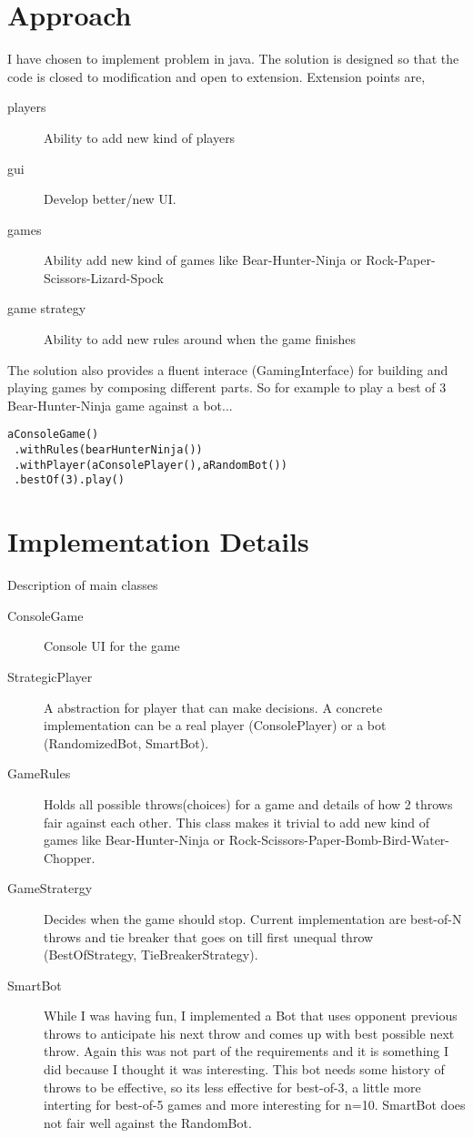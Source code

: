 \documentclass[a4paper]{article}
\begin{document}
 
\section{Approach}
I have chosen to implement problem in java. The solution is designed so that the code is closed to modification and open to extension. Extension points are,
\begin{description}
    \item[players] Ability to add new kind of players
    \item[gui] Develop better/new UI.
    \item[games] Ability add new kind of games like Bear-Hunter-Ninja or Rock-Paper-Scissors-Lizard-Spock
    \item[game strategy] Ability to add new rules around when the game finishes
\end{description}
The solution also provides a fluent interace (GamingInterface) for building and playing games by composing different parts. 
So for example to play a best of 3 Bear-Hunter-Ninja game against a bot...  
\begin{verbatim}
aConsoleGame()
 .withRules(bearHunterNinja())
 .withPlayer(aConsolePlayer(),aRandomBot())
 .bestOf(3).play()
\end{verbatim}

\section{Implementation Details}
Description of main classes

\begin{description}
    \item[ConsoleGame] Console UI for the game
    \item[StrategicPlayer] A abstraction for player that can make decisions. A concrete implementation can be a real player (ConsolePlayer) or a bot (RandomizedBot, SmartBot).
    \item[GameRules] Holds all possible throws(choices) for a game and details of how 2 throws fair against each other. This class makes it trivial to add new kind of games like Bear-Hunter-Ninja or Rock-Scissors-Paper-Bomb-Bird-Water-Chopper.
    \item[GameStratergy] Decides when the game should stop. Current implementation are best-of-N throws and tie breaker that goes on till first unequal throw (BestOfStrategy, TieBreakerStrategy).
    \item[SmartBot] While I was having fun, I implemented a Bot that uses opponent previous throws to anticipate his next throw and comes up with best possible next throw. Again this was not part of the requirements and it is something I did because I thought it was interesting. This bot needs some history of throws to be effective, so its less effective for best-of-3, a little more interting for best-of-5 games and more interesting for n=10. SmartBot does not fair well against the RandomBot. 
\end{description}
\end{document}
